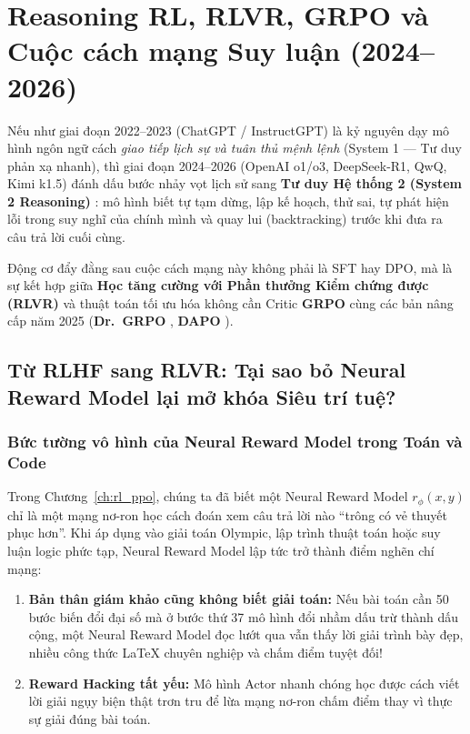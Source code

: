 \chapter{Reasoning RL, RLVR, GRPO và Cuộc cách mạng Suy luận (2024–2026)}
\label{ch:reasoning_rl}

Nếu như giai đoạn 2022--2023 (ChatGPT / InstructGPT) là kỷ nguyên dạy mô hình ngôn ngữ cách \textit{giao tiếp lịch sự và tuân thủ mệnh lệnh} (System 1 --- Tư duy phản xạ nhanh), thì giai đoạn 2024--2026 (OpenAI o1/o3, DeepSeek-R1, QwQ, Kimi k1.5) đánh dấu bước nhảy vọt lịch sử sang \textbf{Tư duy Hệ thống 2 (System 2 Reasoning)} \citep{kahneman2011thinking, wei2022chain, deepseek2025r1}: mô hình biết tự tạm dừng, lập kế hoạch, thử sai, tự phát hiện lỗi trong suy nghĩ của chính mình và quay lui (backtracking) trước khi đưa ra câu trả lời cuối cùng.

Động cơ đẩy đằng sau cuộc cách mạng này không phải là SFT hay DPO, mà là sự kết hợp giữa \textbf{Học tăng cường với Phần thưởng Kiểm chứng được (RLVR)} \citep{lambert2024tulu} và thuật toán tối ưu hóa không cần Critic \textbf{GRPO} \citep{shao2024deepseekmath} cùng các bản nâng cấp năm 2025 (\textbf{Dr.~GRPO} \citealt{liu2025understanding}, \textbf{DAPO} \citealt{yu2025dapo}).

\section{Từ RLHF sang RLVR: Tại sao bỏ Neural Reward Model lại mở khóa Siêu trí tuệ?}
\label{sec:rlvr}

\subsection{Bức tường vô hình của Neural Reward Model trong Toán và Code}

Trong Chương~\ref{ch:rl_ppo}, chúng ta đã biết một Neural Reward Model $r_\phi(x, y)$ chỉ là một mạng nơ-ron học cách đoán xem câu trả lời nào ``trông có vẻ thuyết phục hơn''. Khi áp dụng vào giải toán Olympic, lập trình thuật toán hoặc suy luận logic phức tạp, Neural Reward Model lập tức trở thành điểm nghẽn chí mạng:
\begin{enumerate}
  \item \textbf{Bản thân giám khảo cũng không biết giải toán:} Nếu bài toán cần 50 bước biến đổi đại số mà ở bước thứ 37 mô hình đổi nhầm dấu trừ thành dấu cộng, một Neural Reward Model đọc lướt qua vẫn thấy lời giải trình bày đẹp, nhiều công thức LaTeX chuyên nghiệp và chấm điểm tuyệt đối!
  \item \textbf{Reward Hacking tất yếu:} Mô hình Actor nhanh chóng học được cách viết lời giải ngụy biện thật trơn tru để lừa mạng nơ-ron chấm điểm thay vì thực sự giải đúng bài toán.
\end{enumerate}

